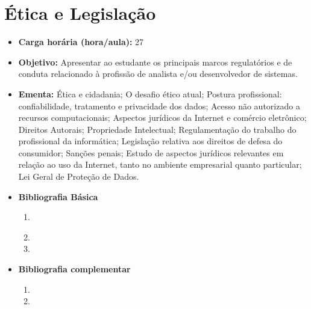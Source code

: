 \documentclass[11pt,fleqn]{book} %
\begin{document}
\section{Ética e Legislação}\label{5_etica}
\begin{itemize}
	\item \textbf{Carga horária (hora/aula):} 27
	\item \textbf{Objetivo:} Apresentar ao estudante os principais marcos regulatórios e de conduta relacionado à profissão de analista e/ou desenvolvedor de sistemas.
	\item \textbf{Ementa:}
	Ética e cidadania;
	O desafio ético atual;
	Postura profissional: confiabilidade, tratamento e privacidade dos dados;
	Acesso não autorizado a recursos computacionais;
	Aspectos jurídicos da Internet e comércio eletrônico; 
	Direitos Autorais;
	Propriedade Intelectual;
	Regulamentação do trabalho do profissional da informática;
	Legislação relativa aos direitos de defesa do consumidor;
	Sanções penais;
	Estudo de aspectos jurídicos relevantes em relação ao uso da Internet, tanto no ambiente empresarial quanto particular;
	Lei Geral de Proteção de Dados.
	\item \textbf{Bibliografia Básica}
	\begin{enumerate}
		\item \cite{cartilha2012}
		\item 
		\item 
	\end{enumerate}
	\item \textbf{Bibliografia complementar}
	\begin{enumerate}
		\item 
		\item
	\end{enumerate} 	
\end{itemize}

\newpage
\end{document}
